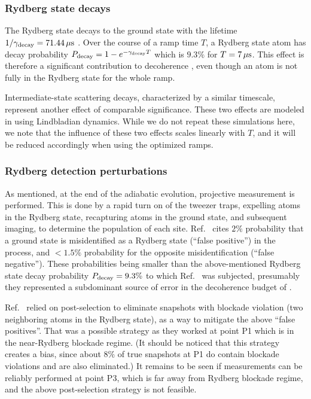 \documentclass[a4paper,12pt]{article}
\theoremstyle{remark}
\theoremstyle{theorem}
\begin{document}
\subsubsection{Rydberg state decays}

The Rydberg state decays to the ground state with the lifetime $1/\gamma_{\rm decay}=71.44\,\mu{\rm s}$ \cite{Fang:2024uyf}. Over the course of a ramp time $T$, a Rydberg state atom has decay probability $P_{\rm decay}=1-e^{-\gamma_{\rm decay} T}$ which is $9.3\%$ for $T=7\,\mu{\rm s}$. This effect is therefore a significant contribution to decoherence \cite{Fang:2024uyf}, even though an atom is not fully in the Rydberg state for the whole ramp.

Intermediate-state scattering decays, characterized by a similar timescale, represent another effect of comparable significance. These two effects are modeled in \cite{Fang:2024uyf} using Lindbladian dynamics. While we do not repeat these simulations here, we note that the influence of these two effects scales linearly with $T$, and it will be reduced accordingly when using the optimized ramps.

\subsubsection{Rydberg detection perturbations}

As mentioned, at the end of the adiabatic evolution, projective measurement is performed. This is done by a rapid turn on of the tweezer traps, expelling atoms in the Rydberg state, recapturing atoms in the ground state, and subsequent imaging, to determine the population of each site. Ref.~\cite{Fang:2024uyf} cites $2\%$ probability that a ground state is misidentified as a Rydberg state (``false positive'') in the process, and $<1.5\%$ probability for the opposite misidentification (``false negative''). These probabilities being smaller than the above-mentioned Rydberg state decay probability $P_{\rm decay}=9.3\%$ to which Ref.~\cite{Fang:2024uyf} was subjected, presumably they represented a subdominant source of error in the decoherence budget of \cite{Fang:2024uyf}.

Ref.~\cite{Fang:2024uyf} relied on post-selection to eliminate snapshots with blockade violation (two neighboring atoms in the Rydberg state), as a way to mitigate the above ``false positives''. That was a possible strategy as they worked at point P1 which is in the near-Rydberg blockade regime. (It should be noticed that this strategy creates a bias, since about $8\%$ of true snapshots at P1 do contain blockade violations \cite{Fang:2024uyf} and are also eliminated.)  It remains to be seen if measurements can be reliably performed at point P3, which is far away from Rydberg blockade regime, and the above post-selection strategy is not feasible.
\end{document}
